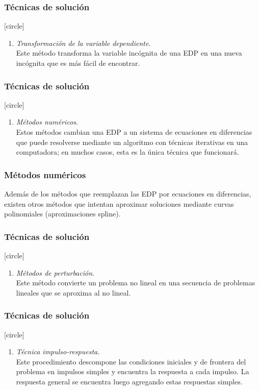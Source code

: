 \documentclass[12pt]{beamer}
\begin{document}
\begin{frame}
\frametitle{Técnicas de solución}
[circle]
\begin{enumerate}
\conti
\item \emph{Transformación de la variable dependiente}.
\\
\bigskip
Este método transforma la variable incógnita de una EDP en una nueva incógnita que es más fácil de encontrar.
\seti
\end{enumerate}
\end{frame}
\begin{frame}
\frametitle{Técnicas de solución}
[circle]
\begin{enumerate}
\conti
\item \emph{Métodos numéricos}. 
\\
\bigskip
Estos métodos cambian una EDP a un sistema de ecuaciones en diferencias que puede resolverse mediante un algoritmo con técnicas iterativas en una computadora; en muchos casos, esta es la única técnica que funcionará. 
\seti
\end{enumerate}
\end{frame}
\begin{frame}
\frametitle{Métodos numéricos}
Además de los métodos que reemplazan las EDP por ecuaciones en diferencias, existen otros métodos que intentan aproximar soluciones mediante curvas polinomiales (aproximaciones spline).
\end{frame}
\begin{frame}
\frametitle{Técnicas de solución}
[circle]
\begin{enumerate}
\conti
\item \emph{Métodos de perturbación}.
\\
\bigskip
Este método convierte un problema no lineal en una secuencia de problemas lineales que se aproxima al no lineal.
\seti
\end{enumerate}
\end{frame}
\begin{frame}
\frametitle{Técnicas de solución}
[circle]
\begin{enumerate}
\conti
\item \emph{Técnica impulso-respuesta}.
\\
\bigskip
Este procedimiento descompone las condiciones iniciales y de frontera del problema en impulsos simples y encuentra la respuesta a cada impulso. La respuesta general se encuentra luego agregando estas respuestas simples.
\seti
\end{enumerate}
\end{frame}
\end{document}
